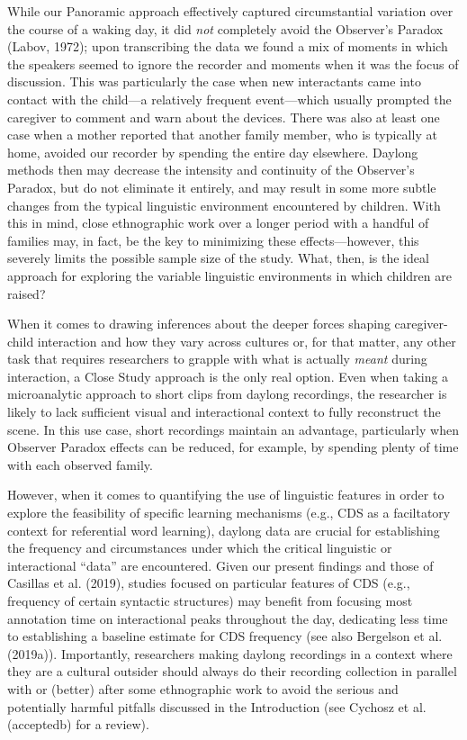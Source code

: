 \documentclass[,man,floatsintext]{apa6}
\begin{document}
While our Panoramic approach effectively captured circumstantial
variation over the course of a waking day, it did \emph{not} completely
avoid the Observer's Paradox (Labov, 1972); upon transcribing the data
we found a mix of moments in which the speakers seemed to ignore the
recorder and moments when it was the focus of discussion. This was
particularly the case when new interactants came into contact with the
child---a relatively frequent event---which usually prompted the
caregiver to comment and warn about the devices. There was also at least
one case when a mother reported that another family member, who is
typically at home, avoided our recorder by spending the entire day
elsewhere. Daylong methods then may decrease the intensity and
continuity of the Observer's Paradox, but do not eliminate it entirely,
and may result in some more subtle changes from the typical linguistic
environment encountered by children. With this in mind, close
ethnographic work over a longer period with a handful of families may,
in fact, be the key to minimizing these effects---however, this severely
limits the possible sample size of the study. What, then, is the ideal
approach for exploring the variable linguistic environments in which
children are raised?

When it comes to drawing inferences about the deeper forces shaping
caregiver-child interaction and how they vary across cultures or, for
that matter, any other task that requires researchers to grapple with
what is actually \emph{meant} during interaction, a Close Study approach
is the only real option. Even when taking a microanalytic approach to
short clips from daylong recordings, the researcher is likely to lack
sufficient visual and interactional context to fully reconstruct the
scene. In this use case, short recordings maintain an advantage,
particularly when Observer Paradox effects can be reduced, for example,
by spending plenty of time with each observed family.

However, when it comes to quantifying the use of linguistic features in
order to explore the feasibility of specific learning mechanisms (e.g.,
CDS as a faciltatory context for referential word learning), daylong
data are crucial for establishing the frequency and circumstances under
which the critical linguistic or interactional \enquote{data} are
encountered. Given our present findings and those of Casillas et al.
(2019), studies focused on particular features of CDS (e.g., frequency
of certain syntactic structures) may benefit from focusing most
annotation time on interactional peaks throughout the day, dedicating
less time to establishing a baseline estimate for CDS frequency (see
also Bergelson et al. (2019a)). Importantly, researchers making daylong
recordings in a context where they are a cultural outsider should always
do their recording collection in parallel with or (better) after some
ethnographic work to avoid the serious and potentially harmful pitfalls
discussed in the Introduction (see Cychosz et al. (acceptedb) for a
review).
\end{document}
